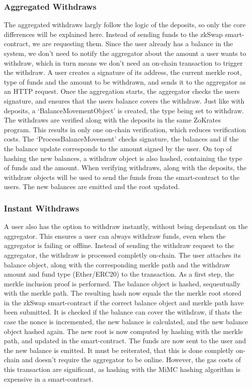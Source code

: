 \documentclass[../../thesis.tex]{subfiles}
\begin{document}
\subsubsection{Aggregated Withdraws} \label{with}
The aggregated withdraws largly follow the logic of the deposits, so only the core differences will be explained here. Instead of sending funds to the zkSwap smart-contract, we are requesting them. Since the user already has a balance in the system, we don't need to notify the aggregator about the amount a user wants to withdraw, which in turn means we don't need an on-chain transaction to trigger the withdraw. A user creates a signature of its address, the current merkle root, type of funds and the amount to be withdrawn, and sends it to the aggregator as an HTTP request. Once the aggregation starts, the aggregator checks the users signature, and ensures that the users balance covers the withdraw. Just like with deposits, a `BalanceMovementObject' is created, the type being set to withdraw. The withdraws are verified along with the deposits in the same ZoKrates program. This results in only one on-chain verification, which reduces verification costs. The `ProcessBalanceMovement' checks signature, the balances and if the the balance update corresponds to the amount signed by the user. On top of hashing the new balances, a withdraw object is also hashed, containing the type of funds and the amount. When verifying withdraws, along with the deposits, the withdraw objects will be used to send the funds from the smart-contract to the users. The new balances are emitted and the root updated. 

\subsubsection{Instant Withdraws}
A user also has the option to withdraw instantly, without being dependant on the aggregator. This ensures a user can always withdraw funds, even when the aggregator is failing or offline. Instead of sending the withdraw request to the aggregator, the withdraw is processed completly on-chain. The user attaches its balance object, along with the corresponding merkle path and the withdraw amount and fund type (Ether/ERC20) to the transaction. As a first step, the merkle inclusion proof is performed. The balance object is hashed, sequeutually with the merkle path. The resulting hash now equals the the merkle root stored in the zkSwap smart-contract if the correct balance object and merkle path have been submitted. It is checked if the balance can cover the withdraw, if thats the case the nonce is incremented, the new balance is calculated, and the new balance object hashed again. The new root is now computed by hashing with the merkle path, and updated in the smart-contract. The funds are now sent to the user and the new balance is emitted. It must be reiterated, that this is done completly on-chain and doesn't require the aggregator to be online. However, the gas costs of this transaction are significant, as hashing with the MiMC hashing algorithm is expensive in a smart-contract.
\end{document}
